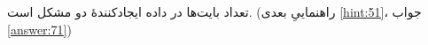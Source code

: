 \section{}
\paragraph{}\label{hint:293}
تعداد بایت‌ها در داده  ایجادکنندهٔ دو مشکل است. (راهنماییِ بعدی \ref{hint:51}، جواب \ref{answer:71})